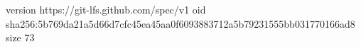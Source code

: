 version https://git-lfs.github.com/spec/v1
oid sha256:5b769da21a5d66d7cfc45ea45aa0f6093883712a5b79231555bb031770166ad8
size 73
